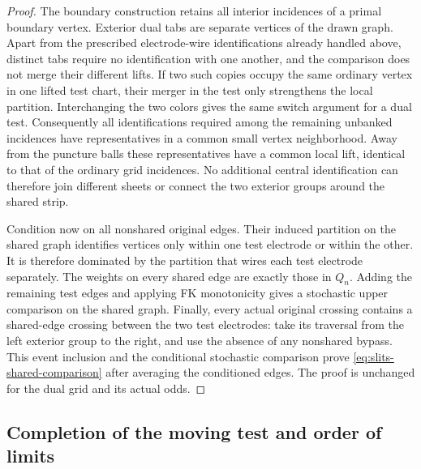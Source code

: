 \begin{proof}
The boundary construction retains all interior incidences of a
primal boundary vertex.  Exterior dual tabs are separate vertices
of the drawn graph.  Apart from the prescribed electrode-wire
identifications already handled above, distinct tabs require no
identification with one another, and the comparison does not merge
their different lifts.  If two such copies occupy the same ordinary
vertex in one lifted test chart, their merger in the test only
strengthens the local partition.  Interchanging the two colors
gives the same switch argument for a dual test.
Consequently all identifications required among the remaining
unbanked incidences have representatives in a common small vertex
neighborhood.  Away from the puncture balls these representatives
have a common local lift, identical to that of the ordinary grid
incidences.  No additional central identification can therefore join
different sheets or connect the two exterior groups around the shared strip.

Condition now on all nonshared original edges.  Their induced
partition on the shared graph identifies vertices only within
one test electrode or within the other.  It is therefore dominated
by the partition that wires each test electrode separately.
The weights on every shared edge are exactly those in $Q_n$.
Adding the remaining test edges and applying FK monotonicity gives
a stochastic upper comparison on the shared graph.  Finally, every
actual original crossing contains a shared-edge crossing between
the two test electrodes: take its traversal from the left exterior
group to the right, and use the absence of any nonshared bypass.
This event inclusion and the conditional stochastic comparison prove
\eqref{eq:slits-shared-comparison} after averaging the conditioned
edges.  The proof is unchanged for the dual grid and its actual odds.
\end{proof}

\subsection{Completion of the moving test and order of limits}

